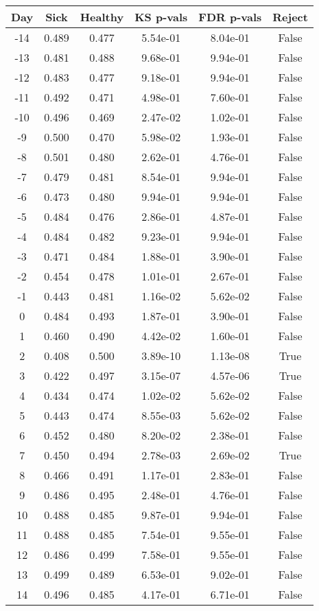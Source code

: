 \begin{tabular}{c|c|c|c|c|c}
Day &  Sick & Healthy &  KS p-vals & FDR p-vals & Reject\\
\hline
-14 & 0.489 &   0.477 &   5.54e-01 &   8.04e-01 &  False\\
-13 & 0.481 &   0.488 &   9.68e-01 &   9.94e-01 &  False\\
-12 & 0.483 &   0.477 &   9.18e-01 &   9.94e-01 &  False\\
-11 & 0.492 &   0.471 &   4.98e-01 &   7.60e-01 &  False\\
-10 & 0.496 &   0.469 &   2.47e-02 &   1.02e-01 &  False\\
 -9 & 0.500 &   0.470 &   5.98e-02 &   1.93e-01 &  False\\
 -8 & 0.501 &   0.480 &   2.62e-01 &   4.76e-01 &  False\\
 -7 & 0.479 &   0.481 &   8.54e-01 &   9.94e-01 &  False\\
 -6 & 0.473 &   0.480 &   9.94e-01 &   9.94e-01 &  False\\
 -5 & 0.484 &   0.476 &   2.86e-01 &   4.87e-01 &  False\\
 -4 & 0.484 &   0.482 &   9.23e-01 &   9.94e-01 &  False\\
 -3 & 0.471 &   0.484 &   1.88e-01 &   3.90e-01 &  False\\
 -2 & 0.454 &   0.478 &   1.01e-01 &   2.67e-01 &  False\\
 -1 & 0.443 &   0.481 &   1.16e-02 &   5.62e-02 &  False\\
  0 & 0.484 &   0.493 &   1.87e-01 &   3.90e-01 &  False\\
  1 & 0.460 &   0.490 &   4.42e-02 &   1.60e-01 &  False\\
  2 & 0.408 &   0.500 &   3.89e-10 &   1.13e-08 &   True\\
  3 & 0.422 &   0.497 &   3.15e-07 &   4.57e-06 &   True\\
  4 & 0.434 &   0.474 &   1.02e-02 &   5.62e-02 &  False\\
  5 & 0.443 &   0.474 &   8.55e-03 &   5.62e-02 &  False\\
  6 & 0.452 &   0.480 &   8.20e-02 &   2.38e-01 &  False\\
  7 & 0.450 &   0.494 &   2.78e-03 &   2.69e-02 &   True\\
  8 & 0.466 &   0.491 &   1.17e-01 &   2.83e-01 &  False\\
  9 & 0.486 &   0.495 &   2.48e-01 &   4.76e-01 &  False\\
 10 & 0.488 &   0.485 &   9.87e-01 &   9.94e-01 &  False\\
 11 & 0.488 &   0.485 &   7.54e-01 &   9.55e-01 &  False\\
 12 & 0.486 &   0.499 &   7.58e-01 &   9.55e-01 &  False\\
 13 & 0.499 &   0.489 &   6.53e-01 &   9.02e-01 &  False\\
 14 & 0.496 &   0.485 &   4.17e-01 &   6.71e-01 &  False\\
\end{tabular}